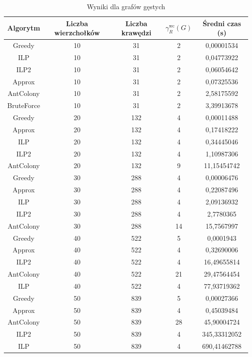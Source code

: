 \begin{table}[H]
    \centering
    \begin{tabular}{|c|c|c|c|c|}
    \hline
    Algorytm & Liczba wierzchołków & Liczba krawędzi & $\gamma^{\text{wc}}_R(G)$ & Średni czas (s) \\
    \hline
    Greedy & 10 & 31 & 2 & 0,00001534 \\
    ILP & 10 & 31 & 2 & 0,04773922 \\
    ILP2 & 10 & 31 & 2 & 0,06054642 \\
    Approx & 10 & 31 & 2 & 0,07325536 \\
    AntColony & 10 & 31 & 2 & 2,58175592 \\
    BruteForce & 10 & 31 & 2 & 3,39913678 \\
     \hline
     Greedy & 20 & 132 & 4 & 0,00011488 \\
     Approx & 20 & 132 & 4 & 0,17418222 \\
     ILP & 20 & 132 & 4 & 0,34445046 \\
     ILP2 & 20 & 132 & 4 & 1,10987306 \\
     AntColony & 20 & 132 & 9 & 11,15454742 \\
    \hline
    Greedy & 30 & 288 & 4 & 0,00006476 \\
    Approx & 30 & 288 & 4 & 0,22087496 \\
    ILP & 30 & 288 & 4 & 2,09136932 \\
    ILP2 & 30 & 288 & 4 & 2,7780365 \\
    AntColony & 30 & 288 & 14 & 15,7567997 \\
    \hline
    Greedy & 40 & 522 & 5 & 0,0001943 \\
    Approx & 40 & 522 & 4 & 0,32690006 \\
    ILP2 & 40 & 522 & 4 & 16,49655814 \\
    AntColony & 40 & 522 & 21 & 29,47564454 \\
    ILP & 40 & 522 & 4 & 77,93719362 \\
    \hline
    Greedy & 50 & 839 & 5 & 0,00027366 \\
    Approx & 50 & 839 & 4 & 0,45039484 \\
    AntColony & 50 & 839 & 28 & 45,90004724 \\
    ILP2 & 50 & 839 & 4 & 345,33312052 \\
    ILP & 50 & 839 & 4 & 690,41462788 \\

    \hline
    \end{tabular}
    \caption{Wyniki dla grafów gęstych}
    \end{table}

